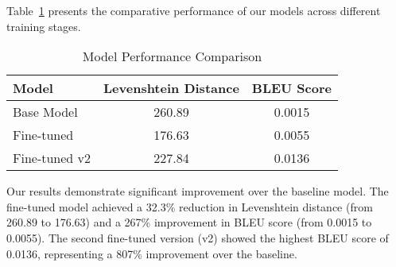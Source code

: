 \documentclass[../main.tex]{subfiles}
\begin{document}
Table~\ref{tab:results} presents the comparative performance of our models across different training stages.

\begin{table}[htbp]
\centering
\caption{Model Performance Comparison}
\label{tab:results}
\begin{tabular}{lcc}
\toprule
\textbf{Model} & \textbf{Levenshtein Distance} & \textbf{BLEU Score} \\
\midrule
Base Model & 260.89 & 0.0015 \\
Fine-tuned & 176.63 & 0.0055 \\
Fine-tuned v2 & 227.84 & 0.0136 \\
\bottomrule
\end{tabular}
\end{table}

Our results demonstrate significant improvement over the baseline model. The fine-tuned model achieved a 32.3\% reduction in Levenshtein distance (from 260.89 to 176.63) and a 267\% improvement in BLEU score (from 0.0015 to 0.0055). The second fine-tuned version (v2) showed the highest BLEU score of 0.0136, representing a 807\% improvement over the baseline.
\end{document}
